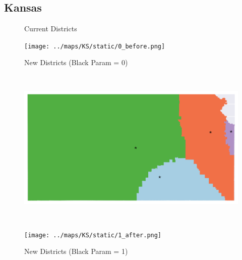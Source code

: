 \subsection{Kansas}
\begin{figure}[htb!] \centering
\caption{ Current Districts }
\texttt{[image: ../maps/KS/static/0\_before.png]}
\caption{ New Districts (Black Param = 0) }
\includegraphics[width=5in,height=3in,keepaspectratio]{../maps/KS/static/0_after.png}
\caption{ New Districts (Black Param = 1) }
\texttt{[image: ../maps/KS/static/1\_after.png]}
\end{figure}

\clearpage
\newpage


